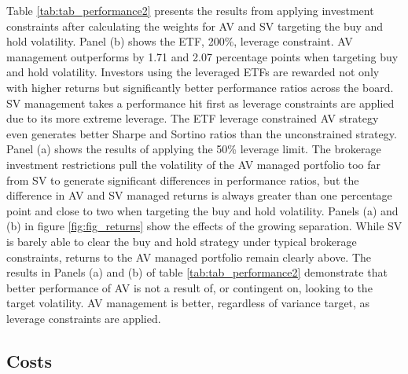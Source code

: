 Table \ref{tab:tab_performance2} presents the results from applying investment constraints after calculating the weights for AV and SV targeting the buy and hold volatility. Panel (b) shows the ETF, 200\%, leverage constraint. AV management outperforms by 1.71 and 2.07 percentage points when targeting buy and hold volatility.  Investors using the leveraged ETFs are rewarded not only with higher returns but significantly better performance ratios across the board. SV management takes a performance hit first as leverage constraints are applied due to its more extreme leverage. The ETF leverage constrained AV strategy even generates better Sharpe and Sortino ratios than the unconstrained strategy. Panel (a) shows the results of applying the 50\% leverage limit. The brokerage investment restrictions pull the volatility of the AV managed portfolio too far from SV to generate significant differences in performance ratios, but the difference in AV and SV managed returns is always greater than one percentage point and close to two when targeting the buy and hold volatility. Panels (a) and (b) in figure \ref{fig:fig_returns} show the effects of the growing separation. While SV is barely able to clear the buy and hold strategy under typical brokerage constraints, returns to the AV managed portfolio remain clearly above.  %
The results in Panels (a) and (b) of table \ref{tab:tab_performance2} demonstrate that better performance of AV is not a result of, or contingent on, looking to the target volatility. AV management is better, regardless of variance target, as leverage constraints are applied.

\subsection{Costs}

